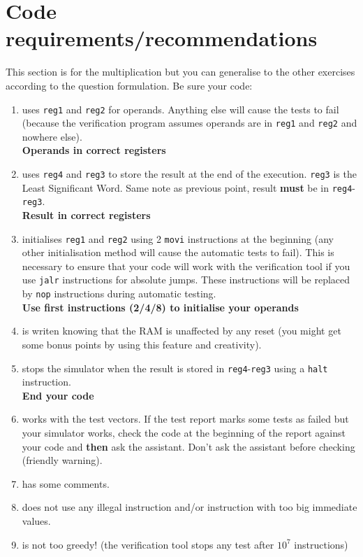 \documentclass[10pt,a4paper]{article}
\theoremstyle{definition}%
\newtheorem{Q}{Question}[] %
\newcommand{\reg}[1]{\texttt{reg#1}}
\begin{document}


\section{Code requirements/recommendations}
This section is for the multiplication but you can generalise to the other exercises according to the question formulation.
\label{ref:guidelines}
Be sure your code:
\begin{enumerate}
\item uses \reg{1} and \reg{2} for operands. Anything else will cause the tests to fail (because the verification program assumes operands are in \reg{1} and \reg{2} and nowhere else). \\ \textbf{Operands in correct registers}
\item uses \reg{4} and \reg{3} to store the result at the end of the execution. \reg{3} is the Least Significant Word. Same note as previous point, result \textbf{must} be in \reg{4}-\reg{3}. \\ \textbf{Result in correct registers}
\item initialises \reg{1} and \reg{2} using 2 \verb!movi! instructions at the beginning (any other initialisation method will cause the automatic tests to fail). This is necessary to ensure that your code will work with the verification tool if you use \verb!jalr! instructions for absolute jumps. These instructions will be replaced by \verb!nop! instructions during automatic testing. \\ \textbf{Use first instructions (2/4/8) to initialise your operands}
\item is writen knowing that the RAM is unaffected by any reset (you might get some bonus points by using this {feature} and creativity).
\item stops the simulator when the result is stored in \reg{4}-\reg{3} using a \verb!halt! instruction. \\\textbf{End your code}
\item works with the test vectors. If the test report marks some tests as failed but your simulator works, check the code at the beginning of the report against your code and \textbf{then} ask the assistant. Don't ask the assistant before checking (friendly warning).
\item has some comments.
\item does not use any illegal instruction and/or instruction with too big immediate values.
\item is not too greedy! (the verification tool stops any test after $10^7$ instructions)
\end{enumerate}
\end{document}
